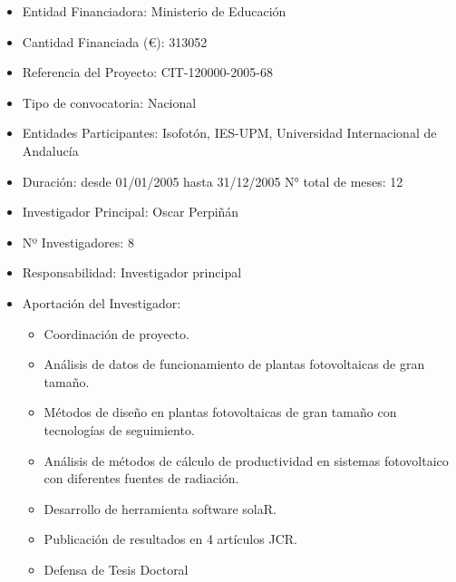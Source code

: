 \documentclass[article, a4paper]{memoir}
\begin{document}
\begin{itemize}
\item Entidad Financiadora: Ministerio de Educación
\item Cantidad Financiada (€): 313052
\item Referencia del Proyecto: CIT-120000-2005-68
\item Tipo de convocatoria: Nacional
\item Entidades Participantes: Isofotón, IES-UPM, Universidad Internacional de Andalucía
\item Duración: desde 01/01/2005 hasta 31/12/2005 N° total de meses: 12
\item Investigador Principal: Oscar Perpiñán
\item Nº Investigadores: 8
\item Responsabilidad: Investigador principal
\item Aportación del Investigador:
\begin{itemize}
\item Coordinación de proyecto.
\item Análisis de datos de funcionamiento de plantas fotovoltaicas de gran tamaño.
\item Métodos de diseño en plantas fotovoltaicas de gran tamaño con tecnologías de seguimiento.
\item Análisis de métodos de cálculo de productividad en sistemas fotovoltaico con diferentes fuentes de radiación.
\item Desarrollo de herramienta software solaR.
\item Publicación de resultados en 4 artículos JCR.
\item Defensa de Tesis Doctoral
\end{itemize}
\end{itemize}
\end{document}
